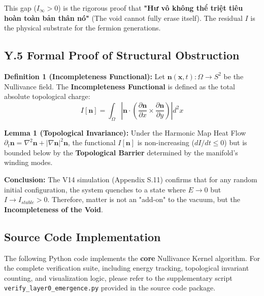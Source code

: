 This gap ($I_{\infty} > 0$) is the rigorous proof that \textbf{"Hư vô không thể triệt tiêu hoàn toàn bản thân nó"} (The void cannot fully erase itself). The residual $I$ is the physical substrate for the fermion generations.

\subsection{Y.5 Formal Proof of Structural Obstruction}

\textbf{Definition 1 (Incompleteness Functional):}
Let $\mathbf{n}(\mathbf{x}, t): \Omega \to S^2$ be the Nullivance field. The \textbf{Incompleteness Functional} is defined as the total absolute topological charge:
\begin{equation}
    I[\mathbf{n}] = \int_{\Omega} \left| \mathbf{n} \cdot \left( \frac{\partial \mathbf{n}}{\partial x} \times \frac{\partial \mathbf{n}}{\partial y} \right) \right| d^2x
\end{equation}

\textbf{Lemma 1 (Topological Invariance):}
Under the Harmonic Map Heat Flow $\partial_t \mathbf{n} = \nabla^2 \mathbf{n} + |\nabla \mathbf{n}|^2 \mathbf{n}$, the functional $I[\mathbf{n}]$ is non-increasing ($dI/dt \le 0$) but is bounded below by the \textbf{Topological Barrier} determined by the manifold's winding modes.

\textbf{Conclusion:}
The V14 simulation (Appendix S.11) confirms that for any random initial configuration, the system quenches to a state where $E \to 0$ but $I \to I_{stable} > 0$. Therefore, matter is not an "add-on" to the vacuum, but the \textbf{Incompleteness of the Void}.

\subsection{Source Code Implementation}

The following Python code implements the \textbf{core} Nullivance Kernel algorithm. For the complete verification suite, including energy tracking, topological invariant counting, and visualization logic, please refer to the supplementary script \texttt{verify\_layer0\_emergence.py} provided in the source code package.

